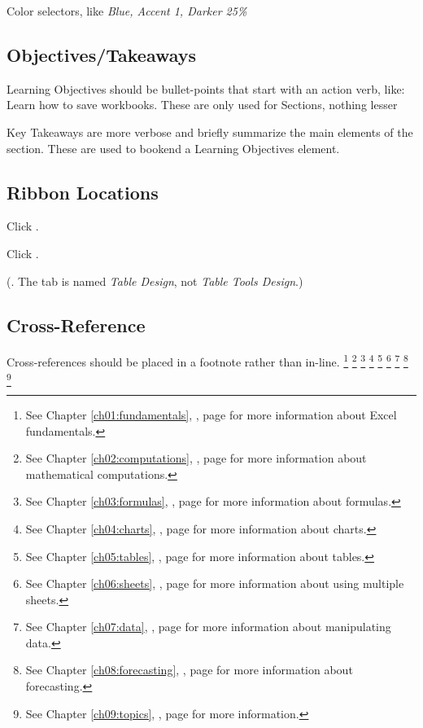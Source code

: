 \begin{enumerate}[resume]
  Color selectors, like \textit{Blue, Accent 1, Darker 25\%}

\subsection{Objectives/Takeaways}

Learning Objectives should be bullet-points that start with an action verb, like: Learn how to save workbooks. These are only used for Sections, nothing lesser

Key Takeaways are more verbose and briefly summarize the main elements of the section. These are used to bookend a Learning Objectives element.

\subsection{Ribbon Locations}
Click .

Click .

(. The tab is named \textit{Table Design}, not \textit{Table Tools Design}.)

\subsection{Cross-Reference}
Cross-references should be placed in a footnote rather than in-line.
\footnote{See Chapter \ref{ch01:fundamentals}, , page \pageref{ch01:fundamentals} for more information about Excel fundamentals.}
\footnote{See Chapter \ref{ch02:computations}, , page \pageref{ch02:computations} for more information about mathematical computations.}
\footnote{See Chapter \ref{ch03:formulas}, , page \pageref{ch03:formulas} for more information about formulas.}
\footnote{See Chapter \ref{ch04:charts}, , page \pageref{ch04:charts} for more information about charts.}
\footnote{See Chapter \ref{ch05:tables}, , page \pageref{ch05:tables} for more information about tables.}
\footnote{See Chapter \ref{ch06:sheets}, , page \pageref{ch06:sheets} for more information about using multiple sheets.}
\footnote{See Chapter \ref{ch07:data}, , page \pageref{ch07:data} for more information about manipulating data.}
\footnote{See Chapter \ref{ch08:forecasting}, , page \pageref{ch08:forecasting} for more information about forecasting.}
\footnote{See Chapter \ref{ch09:topics}, , page \pageref{ch09:topics} for more information.}


\end{enumerate}
